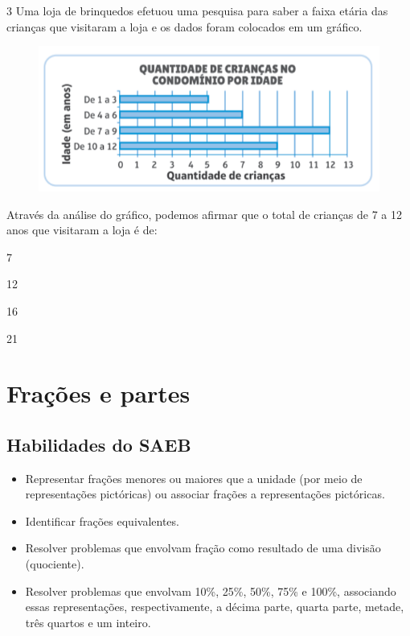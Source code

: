 \num{3} Uma loja de brinquedos efetuou uma pesquisa para
saber a faixa etária das crianças que visitaram a loja e os dados foram colocados em um gráfico.

\begin{figure}[htpb!]
\centering
\includegraphics[width=\textwidth]{./imgs/mat14.png}
\end{figure}

Através da análise do gráfico, podemos afirmar que o total de crianças de 7 a 12 anos que visitaram a loja é de:

\begin{escolha}
\item
  7
\item
  12
\item
  16
\item
  21
\end{escolha}


\chapter{Frações e partes}

\vspace*{-1cm}
\enlargethispage{3\baselineskip}

\section*{Habilidades do SAEB}

\begin{itemize}
\item Representar frações menores ou maiores que a unidade (por meio de
representações pictóricas) ou associar frações a representações pictóricas.

\item Identificar frações equivalentes.

\item Resolver problemas que envolvam fração como resultado de uma divisão
(quociente).

\item Resolver problemas que envolvam 10\%, 25\%, 50\%, 75\% e 100\%,
associando essas representações, respectivamente, a décima parte, quarta parte, metade,
três quartos e um inteiro.
\end{itemize}

